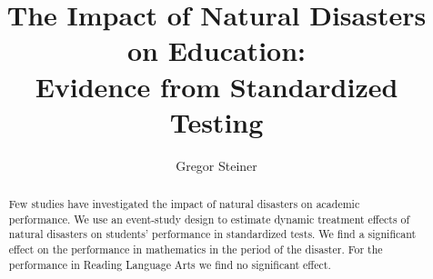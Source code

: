 \documentclass[11pt]{article}
\title{The Impact of Natural Disasters on Education: \\ Evidence from Standardized Testing}
\author{Gregor Steiner}
\begin{document}
\maketitle

\begin{abstract}
	\centering
	\begin{minipage}{\dimexpr\paperwidth-10cm}
		Few studies have investigated the impact of natural disasters on academic performance. We use an event-study design to estimate dynamic treatment effects of natural disasters on students' performance in standardized tests. We find a significant effect on the performance in mathematics in the period of the disaster. For the performance in Reading Language Arts we find no significant effect.
	\end{minipage}
\end{abstract}












\appendix


\newpage




\end{document}
